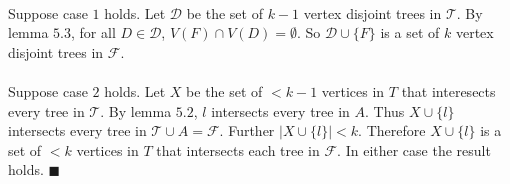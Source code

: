 \documentclass[letterpaper,12pt,oneside,onecolumn]{report}
\begin{document}
\paragraph{}
Suppose case $1$ holds. Let $\mathcal{D}$ be the set of $k-1$ vertex disjoint trees in $\mathcal{T}$. By lemma $5.3$, for all $D \in \mathcal{D}$, $V(F) \cap V(D) = \emptyset$. So $\mathcal{D} \cup \{F\}$ is a set of $k$ vertex disjoint trees in $\mathcal{F}$.
\paragraph{}
Suppose case $2$ holds. Let $X$ be the set of $< k-1$ vertices in $T$ that interesects every tree in $\mathcal{T}$. By lemma $5.2$, $l$ intersects every tree in $A$. Thus $X \cup \{l\}$ intersects every tree in $\mathcal{T} \cup A = \mathcal{F}$. Further $|X \cup \{l\}| < k$. Therefore $X \cup \{l\}$ is a set of $< k$ vertices in $T$ that intersects each tree in $\mathcal{F}$. In either case the result holds. $\blacksquare$  
\end{document}
